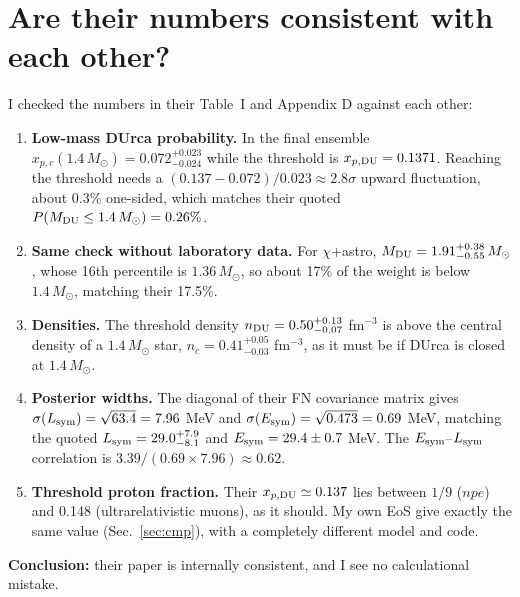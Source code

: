 \documentclass[11pt,a4paper]{article}
\newcommand{\Esym}{E_{\rm sym}}
\newcommand{\Lsym}{L_{\rm sym}}
\newcommand{\Msun}{M_\odot}
\begin{document}
\section{Are their numbers consistent with each other?}
I checked the numbers in their Table~I and Appendix D against each other:
\begin{enumerate}
\item \textbf{Low-mass DUrca probability.} In the final ensemble $x_{p,c}(1.4\,\Msun)=0.072^{+0.023}_{-0.024}$ while the threshold is $x_{p,\rm DU}=0.1371$. Reaching the threshold needs a $(0.137-0.072)/0.023\approx2.8\sigma$ upward fluctuation, about 0.3\% one-sided, which matches their quoted $P(M_{\rm DU}\le1.4\,\Msun)=0.26\%$.
\item \textbf{Same check without laboratory data.} For $\chi$+astro, $M_{\rm DU}=1.91^{+0.38}_{-0.55}\,\Msun$, whose 16th percentile is $1.36\,\Msun$, so about 17\% of the weight is below $1.4\,\Msun$, matching their 17.5\%.
\item \textbf{Densities.} The threshold density $n_{\rm DU}=0.50^{+0.13}_{-0.07}$ fm$^{-3}$ is above the central density of a $1.4\,\Msun$ star, $n_c=0.41^{+0.05}_{-0.03}$ fm$^{-3}$, as it must be if DUrca is closed at $1.4\,\Msun$.
\item \textbf{Posterior widths.} The diagonal of their FN covariance matrix gives $\sigma(\Lsym)=\sqrt{63.4}=7.96$ MeV and $\sigma(\Esym)=\sqrt{0.473}=0.69$ MeV, matching the quoted $\Lsym=29.0^{+7.9}_{-8.1}$ and $\Esym=29.4\pm0.7$ MeV. The $\Esym$--$\Lsym$ correlation is $3.39/(0.69\times7.96)\approx0.62$.
\item \textbf{Threshold proton fraction.} Their $x_{p,\rm DU}\simeq0.137$ lies between $1/9$ ($npe$) and 0.148 (ultrarelativistic muons), as it should. My own EoS give exactly the same value (Sec.~\ref{sec:cmp}), with a completely different model and code.
\end{enumerate}
\textbf{Conclusion:} their paper is internally consistent, and I see no calculational mistake.

\end{document}
